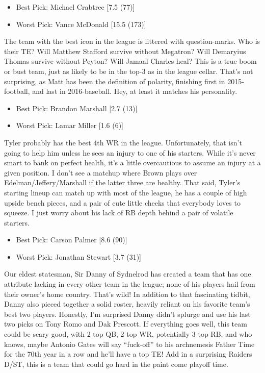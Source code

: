 \documentclass[11pt,letterpaper]{article}
\begin{document}
\newpage
{}
\begin{itemize}
\item Best Pick: Michael Crabtree [7.5 (77)]
\item Worst Pick: Vance McDonald [15.5 (173)]
\end{itemize}
The team with the best icon in the league is littered with question-marks. Who is their TE? Will Matthew Stafford survive without Megatron? Will Demaryius Thomas survive without Peyton? Will Jamaal Charles heal? This is a true boom or bust team, just as likely to be in the top-3 as in the league cellar. That's not surprising, as Matt has been the definition of polarity, finishing first in 2015-football, and last in 2016-baseball. Hey, at least it matches his personality.

\begin{itemize}
\item Best Pick: Brandon Marshall [2.7 (13)]
\item Worst Pick: Lamar Miller [1.6 (6)]
\end{itemize}
Tyler probably has the best 4th WR in the league. Unfortunately, that isn't going to help him unless he sees an injury to one of his starters. While it's never smart to bank on perfect health, it's a little overcautious to assume an injury at a given position. I don't see a matchup where Brown plays over Edelman/Jeffery/Marshall if the latter three are healthy. That said, Tyler's starting lineup can match up with most of the league, he has a couple of high upside bench pieces, and a pair of cute little cheeks that everybody loves to squeeze. I just worry about his lack of RB depth behind a pair of volatile starters.

\begin{itemize}
\item Best Pick: Carson Palmer [8.6 (90)]
\item Worst Pick: Jonathan Stewart [3.7 (31)]
\end{itemize}
Our eldest statesman, Sir Danny of Sydnelrod has created a team that has one attribute lacking in every other team in the league; none of his players hail from their owner's home country. That's wild! In addition to that fascinating tidbit, Danny also pieced together a solid roster, heavily reliant on his favorite team's best two players. Honestly, I'm surprised Danny didn't splurge and use his last two picks on Tony Romo and Dak Prescott. If everything goes well, this team could be scary good, with 2 top QB, 2 top WR, potentially 3 top RB, and who knows, maybe Antonio Gates will say ``fuck-off'' to his archnemesis Father Time for the 70th year in a row and he'll have a top TE! Add in a surprising Raiders D/ST, this is a team that could go hard in the paint come playoff time.
\end{document}
